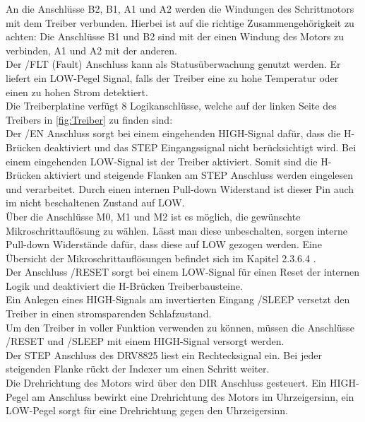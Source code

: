 An die Anschlüsse B2, B1, A1 und A2 werden die Windungen des Schrittmotors mit dem Treiber verbunden.
Hierbei ist auf die richtige Zusammengehörigkeit zu achten:
Die Anschlüsse B1 und B2 sind mit der einen Windung des Motors zu verbinden, A1 und A2 mit der anderen. \\

Der /FLT (Fault)  Anschluss kann als Statusüberwachung genutzt werden.
Er liefert ein LOW-Pegel Signal, falls der Treiber eine zu hohe Temperatur oder einen zu hohen Strom detektiert. \\

Die Treiberplatine verfügt 8 Logikanschlüsse, welche auf der linken Seite des Treibers in \autoref{fig:Treiber} zu finden sind: \\

Der /EN Anschluss sorgt bei einem eingehenden HIGH-Signal dafür, dass die H-Brücken deaktiviert und das STEP Eingangssignal nicht berücksichtigt wird.
Bei einem eingehenden LOW-Signal ist der Treiber aktiviert.
Somit sind die H-Brücken aktiviert und steigende Flanken am STEP Anschluss werden eingelesen und verarbeitet.
Durch einen internen Pull-down Widerstand ist dieser Pin auch im nicht beschaltenen Zustand auf LOW. \\

Über die Anschlüsse M0, M1 und M2 ist es möglich, die gewünschte Mikroschrittauflösung zu wählen.
Lässt man diese unbeschalten, sorgen interne Pull-down Widerstände dafür, dass diese auf LOW gezogen werden.
Eine Übersicht der Mikroschrittauflösungen befindet sich im Kapitel 2.3.6.4 . \\

Der Anschluss /RESET sorgt bei einem LOW-Signal für einen Reset der internen Logik und deaktiviert die H-Brücken Treiberbausteine. \\

Ein Anlegen eines HIGH-Signals am invertierten Eingang /SLEEP versetzt den Treiber in einen stromsparenden Schlafzustand. \\

Um den Treiber in voller Funktion verwenden zu können, müssen die Anschlüsse /RESET und /SLEEP mit einem HIGH-Signal versorgt werden. \\

Der STEP Anschluss des DRV8825 liest ein Rechtecksignal ein.
Bei jeder steigenden Flanke rückt der Indexer um einen Schritt weiter. \\

Die Drehrichtung des Motors wird über den DIR Anschluss gesteuert.
Ein HIGH-Pegel am Anschluss bewirkt eine Drehrichtung des Motors im Uhrzeigersinn, ein LOW-Pegel sorgt für eine Drehrichtung gegen den Uhrzeigersinn.

